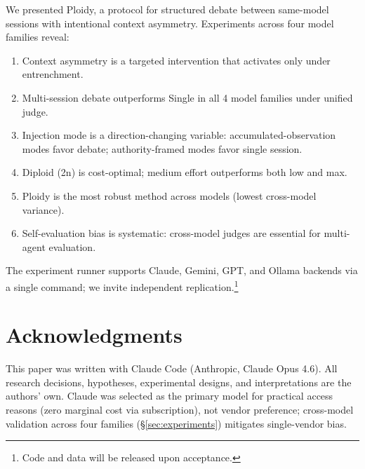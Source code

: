 \documentclass{article}
\begin{document}
We presented Ploidy, a protocol for structured debate between same-model sessions with intentional context asymmetry. Experiments across four model families reveal:
\begin{enumerate}[label=(\arabic*), leftmargin=2em, itemsep=1pt]
  \item Context asymmetry is a targeted intervention that activates only under entrenchment.
  \item Multi-session debate outperforms Single in all 4 model families under unified judge.
  \item Injection mode is a direction-changing variable: accumulated-observation modes favor debate; authority-framed modes favor single session.
  \item Diploid (2n) is cost-optimal; medium effort outperforms both low and max.
  \item Ploidy is the most robust method across models (lowest cross-model variance).
  \item Self-evaluation bias is systematic: cross-model judges are essential for multi-agent evaluation.
\end{enumerate}
The experiment runner supports Claude, Gemini, GPT, and Ollama backends via a single command; we invite independent replication.\footnote{Code and data will be released upon acceptance.}

\section*{Acknowledgments}

This paper was written with Claude Code (Anthropic, Claude Opus 4.6). All research decisions, hypotheses, experimental designs, and interpretations are the authors' own. Claude was selected as the primary model for practical access reasons (zero marginal cost via subscription), not vendor preference; cross-model validation across four families (\S\ref{sec:experiments}) mitigates single-vendor bias.




\appendix
\end{document}
